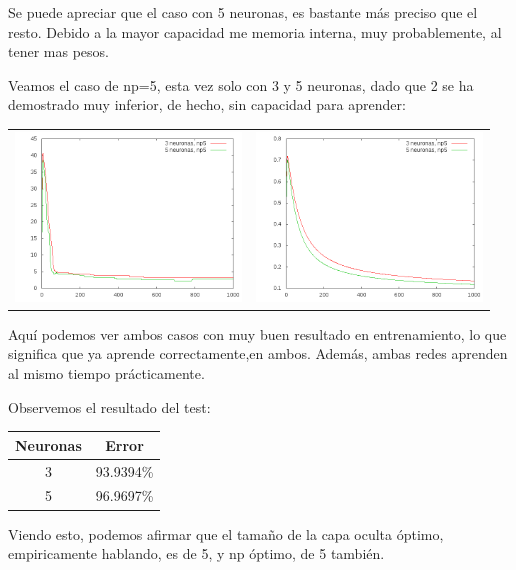 \documentclass[12pt]{article}
\begin{document}
Se puede apreciar que el caso con 5 neuronas, es bastante más preciso que el resto. Debido a la mayor capacidad me memoria interna, muy probablemente, al tener mas pesos.

Veamos el caso de np=5, esta vez solo con 3 y 5 neuronas, dado que 2 se ha demostrado muy inferior, de hecho, sin capacidad para aprender:

\begin{center}
   \begin{tabular}{ c  c }
     \includegraphics[width=6cm]{graficosparte2a/error_train_np5_25} &
     \includegraphics[width=6cm]{graficosparte2a/ecm_train_np5_25}\\ 
   \end{tabular}
 \end{center}

Aquí podemos ver ambos casos con muy buen resultado en entrenamiento, lo que significa que ya aprende correctamente,en ambos. Además, ambas redes aprenden al mismo tiempo prácticamente.

Observemos el resultado del test:

\begin{center}
	\begin{tabular}{| c | c |}
		\hline
		Neuronas & Error \\ \hline
		3 & 93.9394\% \\ \hline
		5 & 96.9697\% \\ \hline
	\end{tabular}
\end{center}

Viendo esto, podemos afirmar que el tamaño de la capa oculta óptimo, empiricamente hablando, es de 5, y np óptimo, de 5 también.
\end{document}
